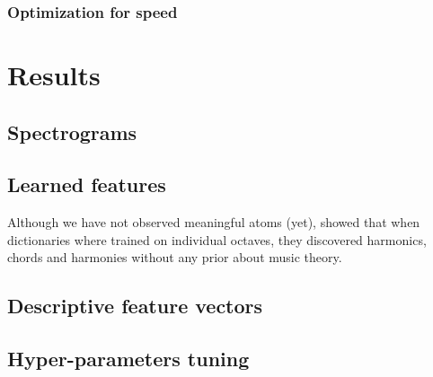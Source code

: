 \subsection{Optimization for speed}




\chapter{Results} \label{chap:results}


\section{Spectrograms}

\section{Learned features}

Although we have not observed meaningful atoms (yet), \cite{lecun2010PSD} showed that when dictionaries where trained on individual octaves, they discovered harmonics, chords and harmonies without any prior about music theory.

\section{Descriptive feature vectors}

\section{Hyper-parameters tuning}

